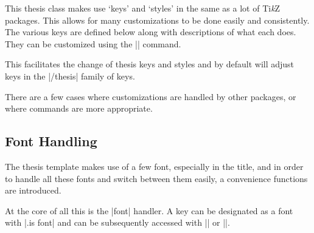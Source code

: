 This thesis class makes use `keys' and `styles' in the same as a lot of
Ti\emph{k}Z packages.  This allows for many customizations to be done easily and
consistently.  The various keys are defined below along with descriptions of
what each does.  They can be customized using the |\thesisset| command.

\begin{command}{\thesisset{}}
  This facilitates the change of thesis keys and styles and by default will
  adjust keys in the |/thesis| family of keys.

\begin{codeexample}[execute code=false]
\end{codeexample}
\end{command}

There are a few cases where customizations are handled by other packages, or
where commands are more appropriate.

\subsection{Font Handling}
\label{subsec:font_handling}

The thesis template makes use of a few font, especially in the title, and in
order to handle all these fonts and switch between them easily, a convenience
functions are introduced.

At the core of all this is the |font| handler.  A key can be designated as a
font with |.is font| and can be subsequently accessed with |\thesisgetfont| or
|\thesisfont|.

